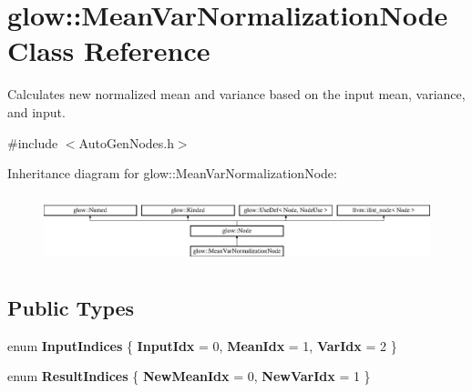 \hypertarget{classglow_1_1_mean_var_normalization_node}{}\section{glow\+:\+:Mean\+Var\+Normalization\+Node Class Reference}
\label{classglow_1_1_mean_var_normalization_node}


Calculates new normalized mean and variance based on the input mean, variance, and input.  




{\ttfamily \#include $<$Auto\+Gen\+Nodes.\+h$>$}

Inheritance diagram for glow\+:\+:Mean\+Var\+Normalization\+Node\+:\begin{figure}[H]
\begin{center}
\leavevmode
\includegraphics[height=1.990521cm]{classglow_1_1_mean_var_normalization_node}
\end{center}
\end{figure}
\subsection*{Public Types}
\begin{DoxyCompactItemize}
\item 
\mbox{\label{classglow_1_1_mean_var_normalization_node_a58e8cd59c3294523471bfc5ff1d1bf7b}} 
enum {\bfseries Input\+Indices} \{ {\bfseries Input\+Idx} = 0, 
{\bfseries Mean\+Idx} = 1, 
{\bfseries Var\+Idx} = 2
 \}
\item 
\mbox{\label{classglow_1_1_mean_var_normalization_node_ab481e55986b3177e26101c650ca069fe}} 
enum {\bfseries Result\+Indices} \{ {\bfseries New\+Mean\+Idx} = 0, 
{\bfseries New\+Var\+Idx} = 1
 \}
\end{DoxyCompactItemize}
